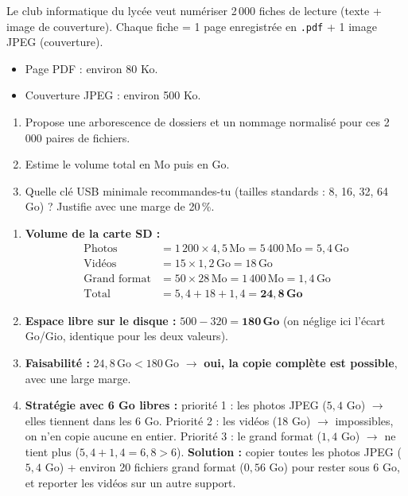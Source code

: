 \documentclass[11pt]{article}
\begin{document}
\begin{exercice}
Le club informatique du lycée veut numériser 2\,000 fiches de lecture (texte + image de couverture). Chaque fiche = 1 page enregistrée en \texttt{.pdf} + 1 image JPEG (couverture).
\begin{itemize}
    \item Page PDF : environ 80 Ko.
    \item Couverture JPEG : environ 500 Ko.
\end{itemize}
\begin{enumerate}
    \item Propose une arborescence de dossiers et un nommage normalisé pour ces 2\,000 paires de fichiers.
    \item Estime le volume total en Mo puis en Go.
    \item Quelle clé USB minimale recommandes-tu (tailles standards : 8, 16, 32, 64 Go) ? Justifie avec une marge de 20\,\%.
\end{enumerate}
\end{exercice}

\begin{corrige}[Exercice 1]
\begin{enumerate}
    \item \textbf{Volume de la carte SD :}
    \begin{align*}
        \text{Photos} &= 1\,200 \times 4{,}5\,\text{Mo} = 5\,400\,\text{Mo} = 5{,}4\,\text{Go} \\
        \text{Vidéos} &= 15 \times 1{,}2\,\text{Go} = 18\,\text{Go} \\
        \text{Grand format} &= 50 \times 28\,\text{Mo} = 1\,400\,\text{Mo} = 1{,}4\,\text{Go} \\
        \text{Total} &= 5{,}4 + 18 + 1{,}4 = \mathbf{24{,}8\,\text{Go}}
    \end{align*}
    \item \textbf{Espace libre sur le disque :} $500 - 320 = \mathbf{180\,\text{Go}}$ (on néglige ici l'écart Go/Gio, identique pour les deux valeurs).
    \item \textbf{Faisabilité :} $24{,}8\,\text{Go} < 180\,\text{Go}$ $\to$ \textbf{oui, la copie complète est possible}, avec une large marge.
    \item \textbf{Stratégie avec 6 Go libres :} priorité 1 : les photos JPEG ($5{,}4$ Go) $\to$ elles tiennent dans les 6 Go. Priorité 2 : les vidéos (18 Go) $\to$ impossibles, on n'en copie aucune en entier. Priorité 3 : le grand format ($1{,}4$ Go) $\to$ ne tient plus ($5{,}4 + 1{,}4 = 6{,}8 > 6$). \textbf{Solution :} copier toutes les photos JPEG ($5{,}4$ Go) + environ 20 fichiers grand format ($0{,}56$ Go) pour rester sous 6 Go, et reporter les vidéos sur un autre support.
\end{enumerate}
\end{corrige}
\end{document}
